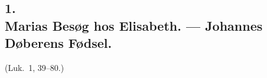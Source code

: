 \documentclass[12pt,a4paper]{book}
\begin{document}
%
%
\subsection*{1.\\[4pt] Marias Besøg hos Elisabeth. --- Johannes Døberens Fødsel.}

\begin{center}
  {\footnotesize (Luk.\ 1, 39--80.)}
\end{center}
\end{document}
